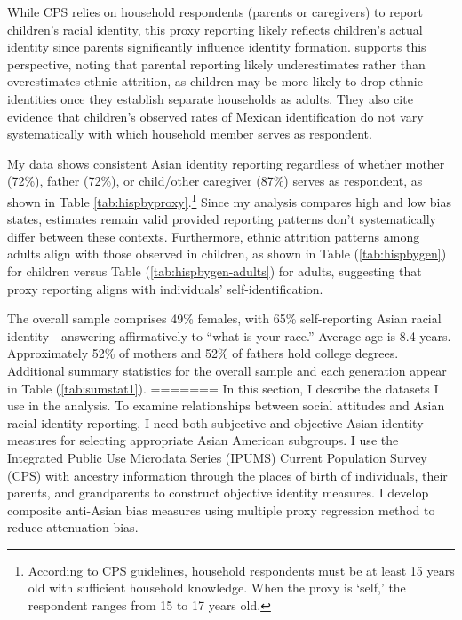 While CPS relies on household respondents (parents or caregivers) to report children's racial identity, this proxy reporting likely reflects children's actual identity since parents significantly influence identity formation. \textcite{antmanEthnicAttritionAssimilation2020} supports this perspective, noting that parental reporting likely underestimates rather than overestimates ethnic attrition, as children may be more likely to drop ethnic identities once they establish separate households as adults. They also cite evidence that children's observed rates of Mexican identification do not vary systematically with which household member serves as respondent. 

My data shows consistent Asian identity reporting regardless of whether mother (72\%), father (72\%), or child/other caregiver (87\%) serves as respondent, as shown in Table \ref{tab:hispbyproxy}.\footnote{According to CPS guidelines, household respondents must be at least 15 years old with sufficient household knowledge. When the proxy is `self,' the respondent ranges from 15 to 17 years old.} Since my analysis compares high and low bias states, estimates remain valid provided reporting patterns don't systematically differ between these contexts. Furthermore, ethnic attrition patterns among adults align with those observed in children, as shown in Table (\ref{tab:hispbygen}) for children versus Table (\ref{tab:hispbygen-adults}) for adults, suggesting that proxy reporting aligns with individuals' self-identification.

The overall sample comprises 49\% females, with 65\% self-reporting Asian racial identity---answering affirmatively to ``what is your race.'' Average age is 8.4 years. Approximately 52\% of mothers and 52\% of fathers hold college degrees. Additional summary statistics for the overall sample and each generation appear in Table (\ref{tab:sumstat1}).
=======
In this section, I describe the datasets I use in the analysis. To examine relationships between social attitudes and Asian racial identity reporting, I need both subjective and objective Asian identity measures for selecting appropriate Asian American subgroups. I use the Integrated Public Use Microdata Series (IPUMS) Current Population Survey (CPS) \autocite{floodsarahIntegratedPublicUse2021a} with ancestry information through the places of birth of individuals, their parents, and grandparents to construct objective identity measures. I develop composite anti-Asian bias measures using \textcite{lubotskyInterpretationRegressionsMultiple2006} multiple proxy regression method to reduce attenuation bias.

